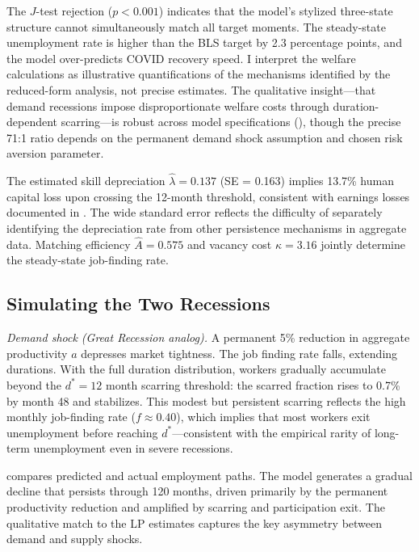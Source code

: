 \documentclass[12pt]{article}
\begin{document}
The $J$-test rejection ($p < 0.001$) indicates that the model's stylized three-state structure cannot simultaneously match all target moments. The steady-state unemployment rate is higher than the BLS target by 2.3 percentage points, and the model over-predicts COVID recovery speed. I interpret the welfare calculations as illustrative quantifications of the mechanisms identified by the reduced-form analysis, not precise estimates. The qualitative insight---that demand recessions impose disproportionate welfare costs through duration-dependent scarring---is robust across model specifications (), though the precise 71:1 ratio depends on the permanent demand shock assumption and chosen risk aversion parameter.

The estimated skill depreciation $\hat{\lambda} = 0.137$ (SE = 0.163) implies 13.7\% human capital loss upon crossing the 12-month threshold, consistent with earnings losses documented in \citet{jacobson1993earnings}. The wide standard error reflects the difficulty of separately identifying the depreciation rate from other persistence mechanisms in aggregate data. Matching efficiency $\hat{A} = 0.575$ and vacancy cost $\hat{\kappa} = 3.16$ jointly determine the steady-state job-finding rate.

\subsection{Simulating the Two Recessions}

\textit{Demand shock (Great Recession analog).} A permanent 5\% reduction in aggregate productivity $a$ depresses market tightness. The job finding rate falls, extending durations. With the full duration distribution, workers gradually accumulate beyond the $d^* = 12$ month scarring threshold: the scarred fraction rises to 0.7\% by month 48 and stabilizes. This modest but persistent scarring reflects the high monthly job-finding rate ($f \approx 0.40$), which implies that most workers exit unemployment before reaching $d^*$---consistent with the empirical rarity of long-term unemployment even in severe recessions.

 compares predicted and actual employment paths. The model generates a gradual decline that persists through 120 months, driven primarily by the permanent productivity reduction and amplified by scarring and participation exit. The qualitative match to the LP estimates captures the key asymmetry between demand and supply shocks.
\end{document}
